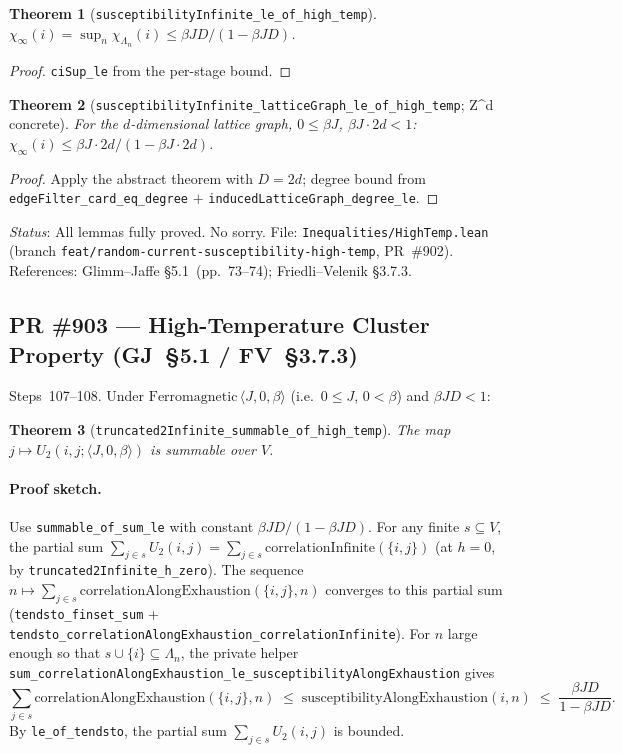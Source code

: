 \documentclass[a4paper,11pt]{article}
\newtheorem{theorem}{Theorem}
\begin{document}
\begin{theorem}[\texttt{susceptibilityInfinite\_le\_of\_high\_temp}]
  $\chi_\infty(i) = \sup_n\chi_{\Lambda_n}(i) \le \beta J D/(1-\beta J D)$.
\end{theorem}
\begin{proof}
  \texttt{ciSup\_le} from the per-stage bound.
\end{proof}

\begin{theorem}[\texttt{susceptibilityInfinite\_latticeGraph\_le\_of\_high\_temp};
  Z\textasciicircum d concrete]
  For the $d$-dimensional lattice graph, $0\le\beta J$, $\beta J\cdot 2d<1$:
  $\chi_\infty(i) \le \beta J\cdot 2d/(1-\beta J\cdot 2d)$.
\end{theorem}
\begin{proof}
  Apply the abstract theorem with $D=2d$;
  degree bound from \texttt{edgeFilter\_card\_eq\_degree}
  $+$ \texttt{inducedLatticeGraph\_degree\_le}.
\end{proof}

\noindent\textit{Status}: All lemmas fully proved. No sorry.
File: \texttt{Inequalities/HighTemp.lean} (branch \texttt{feat/random-current-susceptibility-high-temp}, PR~\#902).
References: Glimm--Jaffe \S5.1~(pp.~73--74); Friedli--Velenik \S3.7.3.

\subsection*{PR \#903 --- High-Temperature Cluster Property (GJ~\S5.1 / FV~\S3.7.3)}

Steps~107--108.  Under \(\mathrm{Ferromagnetic}\,\langle J,0,\beta\rangle\) (i.e.\
$0\le J$, $0<\beta$) and $\beta J D < 1$:

\begin{theorem}[\texttt{truncated2Infinite\_summable\_of\_high\_temp}]
The map $j\mapsto U_2(i,j;\langle J,0,\beta\rangle)$ is summable over $V$.
\end{theorem}

\paragraph{Proof sketch.}
Use \texttt{summable\_of\_sum\_le} with constant $\beta J D/(1-\beta J D)$.
For any finite $s\subseteq V$, the partial sum
$\sum_{j\in s} U_2(i,j) = \sum_{j\in s}\mathrm{correlationInfinite}(\{i,j\})$ (at $h=0$,
by \texttt{truncated2Infinite\_h\_zero}).
The sequence $n\mapsto \sum_{j\in s}\mathrm{correlationAlongExhaustion}(\{i,j\},n)$
converges to this partial sum (\texttt{tendsto\_finset\_sum} +
\texttt{tendsto\_correlationAlongExhaustion\_correlationInfinite}).
For $n$ large enough so that $s\cup\{i\}\subseteq\Lambda_n$, the private helper
\texttt{sum\_correlationAlongExhaustion\_le\_susceptibilityAlongExhaustion} gives
\[
  \textstyle\sum_{j\in s}\mathrm{correlationAlongExhaustion}(\{i,j\},n)
  \;\le\;
  \mathrm{susceptibilityAlongExhaustion}(i,n)
  \;\le\; \frac{\beta J D}{1-\beta J D}.
\]
By \texttt{le\_of\_tendsto}, the partial sum $\sum_{j\in s} U_2(i,j)$ is bounded.
\end{document}
